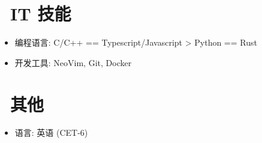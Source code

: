 \documentclass{resume}
\begin{document}
\section{\faCogs\ IT 技能}
\begin{itemize}[parsep=0.5ex]
  \item 编程语言: C/C++ == Typescript/Javascript > Python == Rust
  \item 开发工具: NeoVim, Git, Docker
\end{itemize}


\section{\faInfo\ 其他}
\begin{itemize}[parsep=0.5ex]
  \item 语言: 英语 (CET-6)
\end{itemize}

%
%
\end{document}
